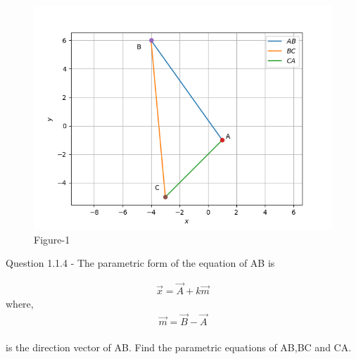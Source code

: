 \documentclass[journal,12pt,twocolumn]{IEEEtran}
\theoremstyle{remark}
\begin{document}
%
\begin{enumerate}
\begin{figure}[[ht]
	\centering
	\includegraphics[width=\columnwidth]{./figs/Figure_1.png}
	\caption{Figure-1}
	\label{fig:Figure_1}
\end{figure}
\end{enumerate}

Question 1.1.4 - The parametric form of the equation of AB is 

\begin{align}
\vec{x} = \vec{A} + k\vec{m} 
\end{align}
where, 
\begin{align}
\vec{m} =\vec{B} - \vec{A}
\end{align}\\
is the direction vector of AB. Find the parametric equations of AB,BC    and CA.\\
\end{document}
